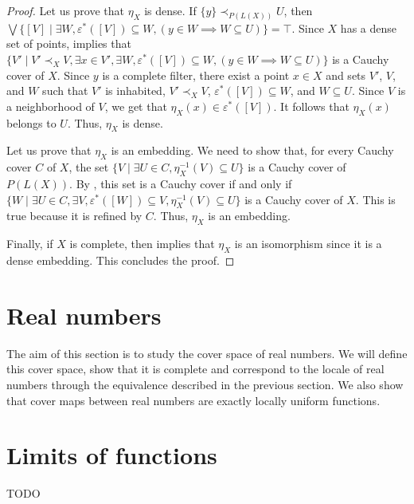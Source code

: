 \documentclass[reqno]{amsart}
\theoremstyle{definition}
\theoremstyle{remark}
\numberwithin{figure}{section}
\newcommand{\rb}{\prec}
\begin{document}
\begin{proof}
Let us prove that $\eta_X$ is dense.
If $\{ y \} \rb_{P(L(X))} U$, then $\bigvee \{ [V] \mid \exists W, \varepsilon^*([V]) \subseteq W, (y \in W \implies W \subseteq U) \} = \top$.
Since $X$ has a dense set of points,  implies that $\{ V' \mid V' \rb_X V, \exists x \in V', \exists W, \varepsilon^*([V]) \subseteq W, (y \in W \implies W \subseteq U) \}$ is a Cauchy cover of $X$.
Since $y$ is a complete filter, there exist a point $x \in X$ and sets $V'$, $V$, and $W$ such that $V'$ is inhabited, $V' \rb_X V$, $\varepsilon^*([V]) \subseteq W$, and $W \subseteq U$.
Since $V$ is a neighborhood of $V$, we get that $\eta_X(x) \in \varepsilon^*([V])$.
It follows that $\eta_X(x)$ belongs to $U$.
Thus, $\eta_X$ is dense.

Let us prove that $\eta_X$ is an embedding.
We need to show that, for every Cauchy cover $C$ of $X$, the set $\{ V \mid \exists U \in C, \eta_X^{-1}(V) \subseteq U \}$ is a Cauchy cover of $P(L(X))$.
By , this set is a Cauchy cover if and only if $\{ W \mid \exists U \in C, \exists V, \varepsilon^*([W]) \subseteq V, \eta_X^{-1}(V) \subseteq U \}$ is a Cauchy cover of $X$.
This is true because it is refined by $C$.
Thus, $\eta_X$ is an embedding.

Finally, if $X$ is complete, then  implies that $\eta_X$ is an isomorphism since it is a dense embedding.
This concludes the proof.
\end{proof}

\section{Real numbers}
\label{sec:reals}

The aim of this section is to study the cover space of real numbers.
We will define this cover space, show that it is complete and correspond to the locale of real numbers through the equivalence described in the previous section.
We also show that cover maps between real numbers are exactly locally uniform functions.

\section{Limits of functions}

TODO



\end{document}
